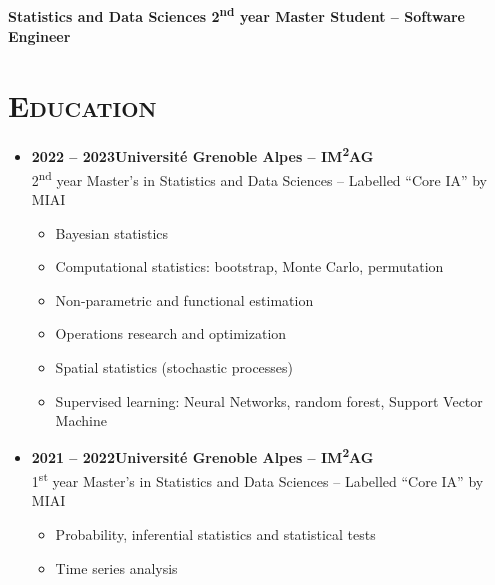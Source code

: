 \documentclass{article}
\begin{document}
\begin{minipage}{0.8\textwidth}
\begin{flushleft}
\begin{minipage}{1\textwidth}
\begin{minipage}{.5\textwidth}
\begin{flushright}
\begin{minipage}{.24\textwidth}
\begin{flushright}
            \end{flushright}
            \end{minipage}
        \end{flushright}
        \end{minipage}
    \end{minipage}
    \\[.3 cm]
    \textbf{Statistics and Data Sciences 2\textsuperscript{nd} year Master Student – Software Engineer}
    \\[.5 cm]
    \section*{\textsc{Education}}
    \begin{itemize}
        \item \textbf{2022 – 2023\qquad \qquad \qquad \qquad Université Grenoble Alpes – IM\textsuperscript{2}AG} \\
        2\textsuperscript{nd} year Master’s in Statistics and Data Sciences – Labelled “Core IA” by MIAI
        \vspace{-.15cm}
        \begin{itemize}[leftmargin=*]
        \setlength\itemsep{.01cm}
            \item Bayesian statistics
            \item Computational statistics: bootstrap, Monte Carlo, permutation
            \item Non-parametric and functional estimation
            \item Operations research and optimization
            \item Spatial statistics (stochastic processes)
            \item Supervised learning: Neural Networks, random forest, Support Vector Machine
        \end{itemize}
        \item \textbf{2021 – 2022\qquad \qquad \qquad \qquad Université Grenoble Alpes – IM\textsuperscript{2}AG} \\
        1\textsuperscript{st} year Master’s in Statistics and Data Sciences – Labelled “Core IA” by MIAI
        \vspace{-.15cm}
        \begin{itemize}[leftmargin=*]
        \setlength\itemsep{.01cm}
            \item Probability, inferential statistics and statistical tests
            \item Time series analysis

\end{itemize}
\end{itemize}
\end{flushleft}
\end{minipage}
\end{document}

